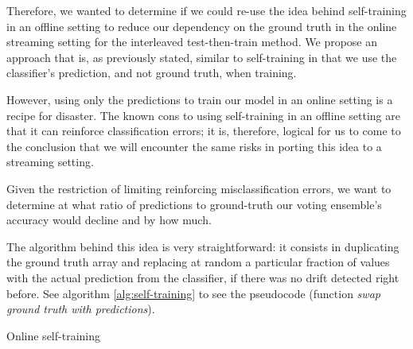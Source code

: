 Therefore, we wanted to determine if we could re-use the idea behind self-training in an offline setting to reduce our dependency on the ground truth in the online streaming setting for the interleaved test-then-train method. We propose an approach that is, as previously stated, similar to self-training in that we use the classifier's prediction, and not ground truth, when training.

However, using only the predictions to train our model in an online setting is a recipe for disaster. The known cons to using self-training in an offline setting are that it can reinforce classification errors; it is, therefore, logical for us to come to the conclusion that we will encounter the same risks in porting this idea to a streaming setting.

Given the restriction of limiting reinforcing misclassification errors, we want to determine at what ratio of predictions to ground-truth our voting ensemble's accuracy would decline and by how much.

The algorithm behind this idea is very straightforward: it consists in duplicating the ground truth array and replacing at random a particular fraction of values with the actual prediction from the classifier, if there was no drift detected right before. See algorithm \ref{alg:self-training} to see the pseudocode (function \textit{swap ground truth with predictions}).

\begin{algorithm}

\caption{\label{alg:self-training}Online self-training}
\end{algorithm}


